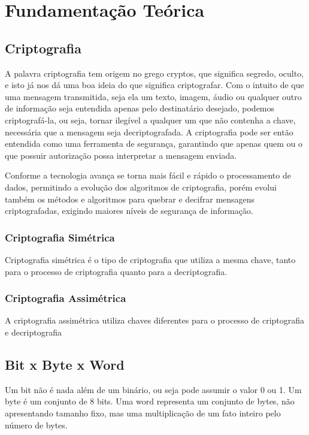 \chapter{Fundamentação Teórica}
	
\section{Criptografia}
	
A palavra criptografia tem origem no grego cryptos, que significa segredo, oculto, e isto já nos dá uma boa ideia do que significa criptografar. Com o intuito de que uma mensagem transmitida, seja ela um texto, imagem, áudio ou qualquer outro de informação seja entendida apenas pelo destinatário desejado, podemos criptografá-la, ou seja, tornar ilegível a qualquer um que não contenha a chave, necessária que a mensagem seja decriptografada. A criptografia pode ser então entendida como uma ferramenta de segurança, garantindo que apenas quem ou o que possuir autorização possa interpretar a mensagem enviada.\par
Conforme a tecnologia avança se torna mais fácil e rápido o processamento de dados, permitindo a evolução dos algoritmos de criptografia, porém evolui também os métodos e algoritmos para quebrar e decifrar mensagens criptografadas, exigindo maiores níveis de segurança de informação. 

	
	\subsection{Criptografia Simétrica }
	
Criptografia simétrica é o tipo de criptografia que utiliza a mesma chave, tanto para o processo de criptografia quanto para a decriptografia.

\subsection{Criptografia Assimétrica }
A criptografia assimétrica utiliza chaves diferentes para o processo de criptografia e decriptografia
\section{Bit x Byte x Word}

Um bit não é nada além de um binário, ou seja pode assumir o valor 0 ou 1. Um byte é um conjunto de 8 bits. Uma word representa um conjunto de bytes, não apresentando tamanho fixo, mas uma multiplicação de um fato inteiro pelo número de bytes.
